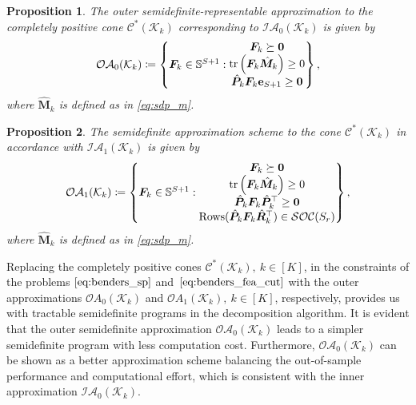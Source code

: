 \documentclass{article}
\newcommand{\tr}{\textup{tr}}
\newtheorem{proposition}{Proposition}
\begin{document}
\begin{proposition}
The outer semidefinite-representable approximation to the completely positive cone $\mathcal{C^*}(\mathcal{K}_k)$ corresponding to $\mathcal{IA}_0 (\mathcal K_k)$ is given by
\begin{equation}
\label{eq:sdp1-dual}
\begin{array}{cl}
     \mathcal{OA}_0 (\mathcal K_k) \coloneqq \left\{ \bm F_k \in \mathbb{S}^{S+1}: \begin{matrix} \bm F_k \succeq \bm 0\\
     \displaystyle \tr \left( \bm F_k \hat{\bm M}_k \right) \geq 0\\
     \hat{\bm P}_k \bm F_k \mathbf{e}_{S+1} \geq \bm 0
    \end{matrix}\right\},
\end{array}
\end{equation}
where $\hat{\bm M}_k$ is defined as in \eqref{eq:sdp_m}.
\end{proposition}

\begin{proposition}
The semidefinite approximation scheme to the cone $\mathcal{C^*}(\mathcal{K}_k)$ in accordance with $\mathcal{IA}_1 (\mathcal K_k)$ is given by
\begin{equation}
\label{eq:sdp2-dual}
\begin{array}{cl}
     \mathcal{OA}_1 (\mathcal K_k) \coloneqq \left\{ \bm F_k \in \mathbb{S}^{S+1}: \begin{matrix} \bm F_k \succeq \bm 0\\
     \displaystyle \tr \left( \bm F_k \hat{\bm M}_k \right) \geq 0\\
     \hat{\bm P}_k \bm F_k \hat{\bm P}_k^\top \geq \bm 0 \\
     \textup{Rows}(\hat{\bm P}_k \bm F_k \hat{\bm R}_k^\top) \in \mathcal{SOC}(S_r)
    \end{matrix}\right\},
\end{array}
\end{equation}
where $\hat{\bm M}_k$ is defined as in \eqref{eq:sdp_m}.
\end{proposition}

Replacing the completely positive cones $\mathcal C^*(\mathcal K_k), \ k \in [K]$, in the constraints of the problems $\eqref{eq:benders_sp}$ and~$\eqref{eq:benders_fea_cut}$ with the outer approximations $\mathcal OA_0 (\mathcal K_k)$ and $\mathcal OA_1 (\mathcal K_k), \ k \in [K]$, respectively, provides us with tractable semidefinite programs in the decomposition algorithm. It is evident that the outer semidefinite approximation $\mathcal{OA}_0 (\mathcal K_k)$ leads to a simpler semidefinite program with less computation cost. Furthermore, $\mathcal{OA}_0 (\mathcal K_k)$ can be shown as a better approximation scheme balancing the out-of-sample performance and computational effort, which is consistent with the inner approximation $\mathcal{IA}_0 (\mathcal K_k)$.
\end{document}
